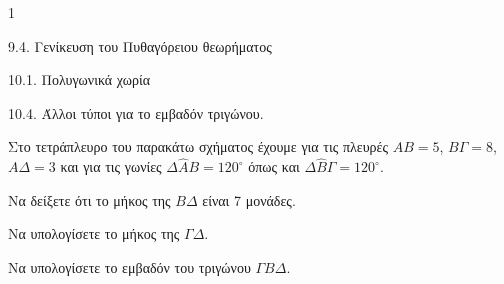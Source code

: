 \begin{ylh}{1}
    \item 9.4. Γενίκευση του Πυθαγόρειου θεωρήματος
    \item 10.1. Πολυγωνικά χωρία
    \item 10.4. Άλλοι τύποι για το εμβαδόν τριγώνου.
\end{ylh}
\begin{figure}
    \centering
\end{figure}

Στο τετράπλευρο του παρακάτω σχήματος έχουμε για τις πλευρές $AB=5$, $B\Gamma=8$, $A\Delta=3$ και για τις γωνίες $\Delta\widehat{A}B = 120^\circ$ όπως και $\Delta\widehat{B}\Gamma = 120^\circ$.
\begin{alist}
    \item Να δείξετε ότι το μήκος της $B\Delta$ είναι 7 μονάδες. 
    \item Να υπολογίσετε το μήκος της $\Gamma\Delta$. 
    \item Να υπολογίσετε το εμβαδόν του τριγώνου $\Gamma B \Delta$. 
\end{alist}